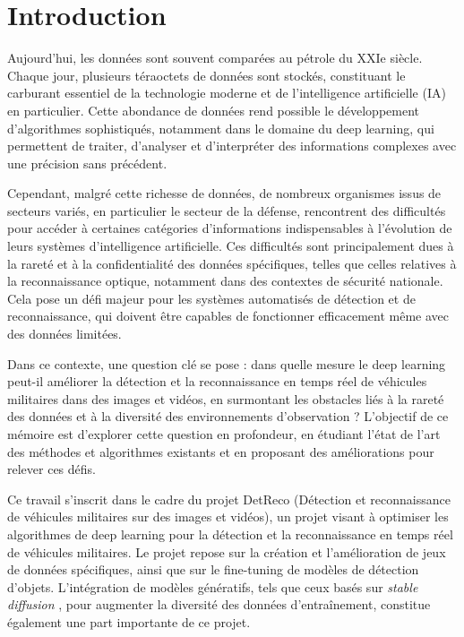 \chapter{Introduction}
\label{chap:intorduction}
\sloppy

Aujourd’hui, les données sont souvent comparées au pétrole du XXIe siècle.
Chaque jour, plusieurs téraoctets de données sont stockés, constituant le carburant essentiel de la technologie moderne et de l'intelligence artificielle (IA) en particulier.
Cette abondance de données rend possible le développement d'algorithmes sophistiqués, notamment dans le domaine du deep learning, qui permettent de traiter, d'analyser et d'interpréter des informations complexes avec une précision sans précédent.

Cependant, malgré cette richesse de données, de nombreux organismes issus de secteurs variés, en particulier le secteur de la défense, rencontrent des difficultés pour accéder à certaines catégories d’informations indispensables à l'évolution de leurs systèmes d'intelligence artificielle.
Ces difficultés sont principalement dues à la rareté et à la confidentialité des données spécifiques, telles que celles relatives à la reconnaissance optique, notamment dans des contextes de sécurité nationale. Cela pose un défi majeur pour les systèmes automatisés de détection et de reconnaissance, qui doivent être capables de fonctionner efficacement même avec des données limitées.

Dans ce contexte, une question clé se pose : dans quelle mesure le deep learning peut-il améliorer la détection et la reconnaissance en temps réel de véhicules militaires dans des images et vidéos, en surmontant les obstacles liés à la rareté des données et à la diversité des environnements d'observation ?
L’objectif de ce mémoire est d'explorer cette question en profondeur, en étudiant l’état de l’art des méthodes et algorithmes existants et en proposant des améliorations pour relever ces défis.

Ce travail s’inscrit dans le cadre du projet DetReco (Détection et reconnaissance de véhicules militaires sur des images et vidéos), un projet visant à optimiser les algorithmes de deep learning pour la détection et la reconnaissance en temps réel de véhicules militaires.
Le projet repose sur la création et l’amélioration de jeux de données spécifiques, ainsi que sur le fine-tuning de modèles de détection d’objets.
L'intégration de modèles génératifs, tels que ceux basés sur \textit{stable diffusion} , pour augmenter la diversité des données d'entraînement, constitue également une part importante de ce projet.

